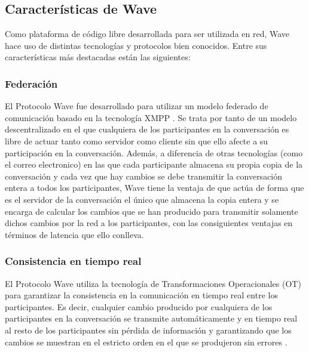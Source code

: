   \subsection{Características de Wave}
  
  Como plataforma de código libre desarrollada para ser utilizada en red, Wave hace uso de distintas tecnologías y protocolos bien conocidos. Entre sus características más destacadas están las siguientes:

    \subsubsection{Federación}\label{sssec:federation}
    
    El Protocolo Wave \cite{ref:wave_over_xmpp} fue desarrollado para utilizar un modelo federado \cite{ref:wave_federation} \cite{ref:wave_white_paper} de comunicación basado en la tecnología XMPP \cite{ref:xmpp} \cite{ref:wave_over_xmpp}. Se trata por tanto de un modelo descentralizado en el que cualquiera de los participantes en la conversación es libre de actuar tanto como servidor como cliente sin que ello afecte a su participación en la conversación. 
    Además, a diferencia de otras tecnologías (como el correo electronico) en las que cada participante almacena su propia copia de la conversación y cada vez que hay cambios se debe transmitir la conversación entera a todos los participantes, Wave tiene la ventaja de que actúa de forma que es el servidor de la conversación el único que almacena la copia entera y se encarga de calcular los cambios que se han producido para transmitir solamente dichos cambios por la red a los participantes, con las consiguientes ventajas en términos de latencia que ello conlleva. 

    \subsubsection{Consistencia en tiempo real}\label{sssec:realTime}
    
    El Protocolo Wave \cite{ref:wave_over_xmpp} utiliza la tecnología de Transformaciones Operacionales (OT) \cite{ref:how_ot_works} para garantizar la consistencia en la comunicación en tiempo real entre los participantes. Es decir, cualquier cambio producido por cualquiera de los participantes en la conversación se transmite automáticamente y en tiempo real al resto de los participantes sin pérdida de información y garantizando que los cambios se muestran en el estricto orden en el que se produjeron sin errores \cite{ref:wave_ot}.
    
